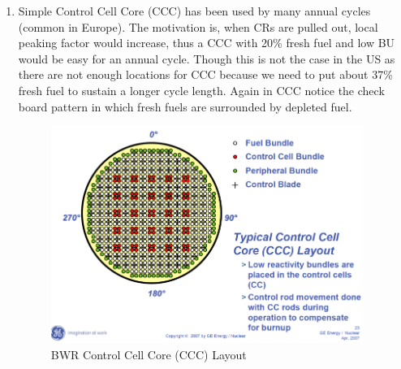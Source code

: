 \documentclass{school-22.211-notes}
\begin{document}
\begin{enumerate}
\item Simple Control Cell Core (CCC) has been used by many annual cycles (common in Europe). The motivation is, when CRs are pulled out, local peaking factor would increase, thus a CCC with 20\% fresh fuel and low BU would be easy for an annual cycle. Though this is not the case in the US as there are not enough locations for CCC because we need to put about 37\% fresh fuel to sustain a longer cycle length. Again in CCC notice the check board pattern in which fresh fuels are surrounded by depleted fuel. 
  \begin{figure}[ht]
    \centering
    \includegraphics[width=4in]{images/design/BWR-CCC.png}
    \caption{BWR Control Cell Core (CCC) Layout} \label{BWR-CCC} 
    \end{figure}
\end{enumerate}
\end{document}

